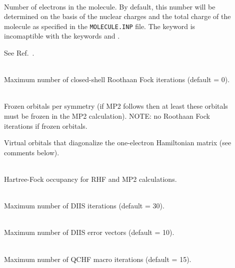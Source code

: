 \begin{description}
\item[]
   \\
  Number of electrons in the molecule. By
  default, this number will be 
  determined on the basis of the nuclear charges and the total charge
  of the molecule as specified in the
  \verb|MOLECULE.INP| file. The 
  keyword is incomaptible with the keywords  and .

\item[]
  See Ref.~\cite{cwbjcp72}.

\item[]
   \\
  Maximum number of closed-shell Roothaan
  Fock iterations (default = 0). 
 
\item[]
   \\
  Frozen orbitals per symmetry (if MP2 follows then at least these orbitals
  must be frozen in the MP2 calculation).
  NOTE: no Roothaan Fock iterations if frozen orbitals.

\item[]
  Virtual orbitals that diagonalize the one-electron Hamiltonian matrix
  (see comments below).
 
\item[]
     \\
  Hartree-Fock occupancy for RHF and MP2
  calculations. 
 
\item[]
   \\
  Maximum number of DIIS iterations (default = 30).

\item[]
   \\
  Maximum number of DIIS error vectors (default = 10).

\item[]
   \\
  Maximum number of QCHF macro iterations (default = 15).
 

\end{description}
